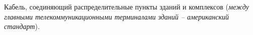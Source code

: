 Кабель, соединяющий распределительные пункты зданий 
и комплексов ({\it между главными телекоммуникационными терминалами зданий -- американский стандарт}).